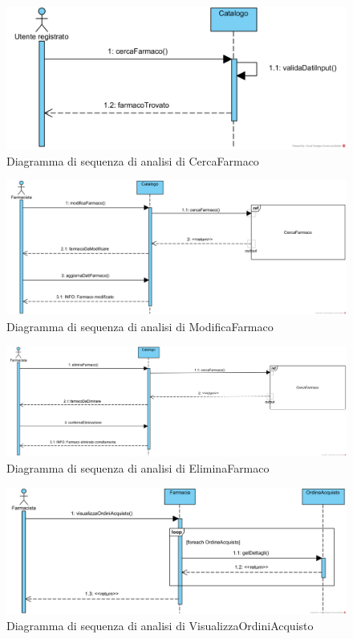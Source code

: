 \begin{figure}[h]
    \centering
	\includegraphics[width=\linewidth]{assets/sequence_analisi/SequenceAnalisiCercaFarmaco.png}
    \caption{Diagramma di sequenza di analisi di CercaFarmaco}
\end{figure}

\begin{figure}[h]
    \centering
	\includegraphics[width=\linewidth]{assets/sequence_analisi/SequenceAnalisiModificaFarmaco.png}
    \caption{Diagramma di sequenza di analisi di ModificaFarmaco}
\end{figure}

\begin{figure}[h]
    \centering
	\includegraphics[width=\linewidth]{assets/sequence_analisi/SequenceAnalisiEliminaFarmaco.png}
    \caption{Diagramma di sequenza di analisi di EliminaFarmaco}
\end{figure}

\begin{figure}[h]
    \centering
	\includegraphics[width=\linewidth]{assets/sequence_analisi/SequenceAnalisiVisualizzaOrdiniAcquisto.png}
    \caption{Diagramma di sequenza di analisi di VisualizzaOrdiniAcquisto}
\end{figure}

